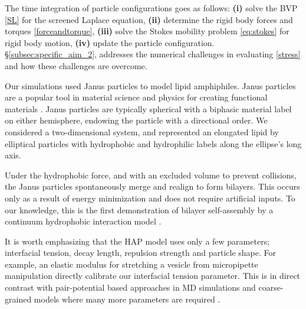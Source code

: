 The time integration of particle configurations goes as follows: 
\textbf{(i)} solve the BVP \eqref{SL} for the screened Laplace equation, 
\textbf{(ii)} determine the rigid body forces and torques \eqref{forceandtorque}, 
\textbf{(iii)} solve the Stokes mobility problem \eqref{eq:stokes} for rigid body motion,
\textbf{(iv)} update the particle configuration. 
\S \ref{subsec:specific_aim_2}, addresses the numerical challenges in 
evaluating \eqref{stress} and how these challenges are overcome. 



Our simulations used Janus particles to model
lipid amphiphiles. Janus particles are a popular tool in material science and physics
for creating functional materials \cite{Lee2014, Lee2013}. 
Janus particles are typically
spherical with a biphasic material label on either hemisphere,  endowing the particle
with a directional order. We considered a two-dimensional system, and represented an 
elongated lipid by elliptical particles with hydrophobic and hydrophilic labels along the ellipse's long axis. 

Under the hydrophobic force, and with an excluded volume to prevent collisions, the 
Janus particles spontaneously merge and realign to form bilayers. This occurs only as a result
of energy minimization and does not require artificial inputs. To our knowledge, this is the first demonstration 
of bilayer self-assembly by a continuum hydrophobic interaction model \cite{Noguchi2001,Farago2003,Brannigan2006,Brooks2009,Wang2013}.  

It is worth emphasizing that the HAP model uses only a few parameters; interfacial tension, decay length, repulsion strength and particle
shape. For example, an elastic modulus for stretching a vesicle from micropipette manipulation 
directly calibrate our interfacial tension parameter. This is in direct contrast with pair-potential based approaches in
MD simulations and coarse-grained models where many more parameters are required \cite{Varilly2011,Wang2013}.

